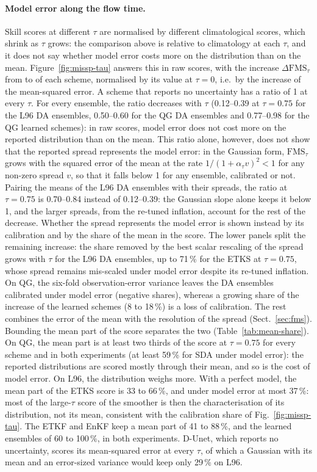 \paragraph{Model error along the flow time.} Skill scores at different $\tau$ are normalised by
different climatological scores, which shrink as $\tau$ grows: the comparison above is relative to
climatology at each $\tau$, and it does not say whether model error costs more on the
distribution than on the mean. Figure~\ref{fig:missp-tau} answers this in raw scores, with the
increase $\Delta\mathrm{FMS}_\tau$ from \Sz{} to \So{} of each scheme, normalised by its value
at $\tau = 0$, i.e.\ by the increase of the mean-squared error. A scheme that reports no
uncertainty has a ratio of 1 at every $\tau$. For every ensemble, the ratio decreases with $\tau$ (0.12--0.39 at $\tau = 0.75$ for the L96
DA ensembles, 0.50--0.60 for the QG DA ensembles and 0.77--0.98 for the QG learned schemes): in
raw scores, model error does not cost more on the reported distribution than on the mean. This
ratio alone, however, does not show that the reported spread represents the model error: in the
Gaussian form, $\mathrm{FMS}_\tau$ grows with the squared error of the mean at the rate
$1/(1+\alpha_\tau v)^2 < 1$ for any non-zero spread $v$, so that it falls below 1 for any
ensemble, calibrated or not. Pairing the \So{} means of the L96 DA ensembles with their \Sz{}
spreads, the ratio at $\tau = 0.75$ is 0.70--0.84 instead of 0.12--0.39: the Gaussian slope alone keeps
it below 1, and the larger \So{} spreads, from the re-tuned inflation, account for the rest of the
decrease. Whether the spread represents the model error is shown instead by its calibration and
by the share of the mean in the score. The lower panels split the remaining increase: the share removed by the
best scalar rescaling of the spread grows with $\tau$ for the L96 DA ensembles, up to 71\,\% for
the ETKS at $\tau = 0.75$, whose spread remains mis-scaled under model error despite its re-tuned
inflation. On QG, the six-fold observation-error variance leaves the DA ensembles calibrated
under model error (negative shares), whereas a growing share of the increase of the learned
schemes (8 to 18\,\%) is a loss of calibration. The rest combines the error of the mean with the
resolution of the spread (Sect.~\ref{sec:fms}). Bounding the mean part of the score separates
the two (Table~\ref{tab:mean-share}). On QG, the mean part is at least two thirds of the score at
$\tau = 0.75$ for every scheme and in both experiments (at least 59\,\% for SDA under model
error): the reported distributions are scored mostly through their mean, and so is the cost of
model error. On L96, the distribution weighs more. With a perfect model, the mean part of the ETKS
score is 33 to 66\,\%, and under model error at most 37\,\%: most of the large-$\tau$ score of
the smoother is then the characterisation of its distribution, not its mean, consistent with the
calibration share of Fig.~\ref{fig:missp-tau}. The ETKF and EnKF keep a mean part of 41 to
88\,\%, and the learned ensembles of 60 to 100\,\%, in both experiments. D-Unet, which reports no
uncertainty, scores its mean-squared error at every $\tau$, of which a Gaussian with its mean and an
error-sized variance would keep only 29\,\% on L96.

